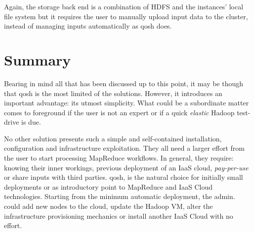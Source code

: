 Again, the storage back end is a combination of HDFS and the instances' local file system but it requires the user to manually upload input data to the cluster, instead of managing inputs automatically as qosh does.

\section{Summary}\label{sec:resumenconclusiones}
\noindent Bearing in mind all that has been discussed up to this point, it may be though that qosh is the most limited of the solutions. However, it introduces an important advantage: its utmost simplicity. What could be a subordinate matter comes to foreground if the user is not an expert or if a quick \emph{elastic} Hadoop test-drive is due.

No other solution presents such a simple and self-contained installation, configuration and infrastructure exploitation. They all need a larger effort from the user to start processing MapReduce workflows. In general, they require: knowing their inner workings, previous deployment of an IaaS cloud, \emph{pay-per-use} or share inputs with third parties. qosh, is the natural choice for initially small deployments or as introductory point to MapReduce and IaaS Cloud technologies. Starting from the minimum automatic deployment, the admin. could add new nodes to the cloud, update the Hadoop VM, alter the infrastructure provisioning mechanics or install another IaaS Cloud with no effort.

